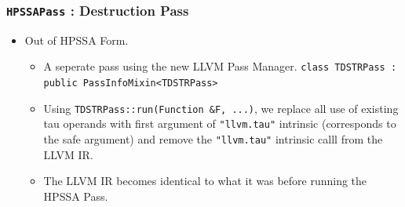 \documentclass[aspectratio=169, compress]{beamer}
\begin{document}
\begin{frame}
	\frametitle{\texttt{HPSSAPass} : Destruction Pass}
	\begin{itemize}
		\item Out of HPSSA Form. 
		\begin{itemize}
			\item A seperate pass using the new LLVM Pass Manager. \texttt{class TDSTRPass : public PassInfoMixin<TDSTRPass>} \pause
			\item Using \texttt{TDSTRPass::run(Function &F, ...)}, we replace all use of existing tau operands with first argument of  \texttt{"llvm.tau"} intrinsic (corresponds to the safe argument) and remove the \texttt{"llvm.tau"} intrinsic calll from the LLVM IR. \pause
			\item The LLVM IR becomes identical to what it was before running the HPSSA Pass. \pause
		\end{itemize}
	\end{itemize}
\begin{figure}[]
	\centering
	\begin{minipage}{0.4\textwidth}
		\centering
	\end{minipage}
	\begin{minipage}{0.4\textwidth}
		\centering
	\end{minipage}
\end{figure}

\end{frame}

\footnotesize
\end{document}
